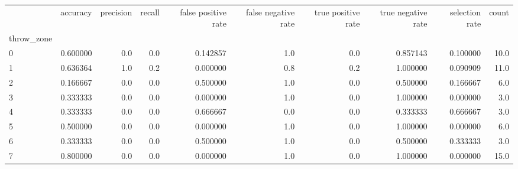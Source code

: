 \begin{tabular}{lrrrrrrrrr}
\toprule
{} &  accuracy &  precision &  recall &  false positive rate &  false negative rate &  true positive rate &  true negative rate &  selection rate &  count \\
throw\_zone &           &            &         &                      &                      &                     &                     &                 &        \\
\midrule
0          &  0.600000 &        0.0 &     0.0 &             0.142857 &                  1.0 &                 0.0 &            0.857143 &        0.100000 &   10.0 \\
1          &  0.636364 &        1.0 &     0.2 &             0.000000 &                  0.8 &                 0.2 &            1.000000 &        0.090909 &   11.0 \\
2          &  0.166667 &        0.0 &     0.0 &             0.500000 &                  1.0 &                 0.0 &            0.500000 &        0.166667 &    6.0 \\
3          &  0.333333 &        0.0 &     0.0 &             0.000000 &                  1.0 &                 0.0 &            1.000000 &        0.000000 &    3.0 \\
4          &  0.333333 &        0.0 &     0.0 &             0.666667 &                  0.0 &                 0.0 &            0.333333 &        0.666667 &    3.0 \\
5          &  0.500000 &        0.0 &     0.0 &             0.000000 &                  1.0 &                 0.0 &            1.000000 &        0.000000 &    6.0 \\
6          &  0.333333 &        0.0 &     0.0 &             0.500000 &                  1.0 &                 0.0 &            0.500000 &        0.333333 &    3.0 \\
7          &  0.800000 &        0.0 &     0.0 &             0.000000 &                  1.0 &                 0.0 &            1.000000 &        0.000000 &   15.0 \\
\bottomrule
\end{tabular}
